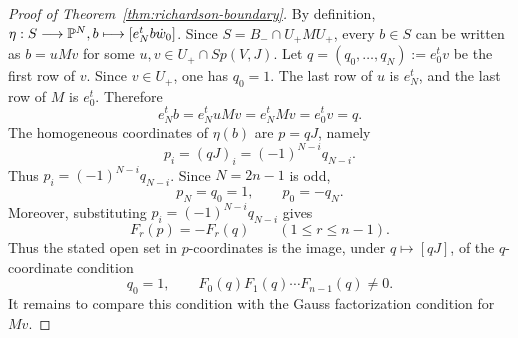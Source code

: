\begin{proof}[Proof of Theorem~\ref{thm:richardson-boundary}]
By definition, \(\eta:S\longrightarrow \mathbb{P}^N,b\longmapsto [e_N^tb\dot w_0]\). Since \(S=B_-\cap U_+MU_+\), every \(b\in S\) can be written as \(b=uMv\) for some \(u,v\in U_+\cap Sp(V,J)\). Let \(q=(q_0,\ldots,q_N):=e_0^tv\) be the first row of \(v\). Since \(v\in U_+\), one has \(q_0=1\). The last row of \(u\) is \(e_N^t\), and the last row of \(M\) is \(e_0^t\). Therefore
\[
e_N^tb=e_N^tuMv=e_N^tMv=e_0^tv=q.
\]
The homogeneous coordinates of \(\eta(b)\) are \(p=qJ\), namely
\[
p_i=(qJ)_i=(-1)^{N-i}q_{N-i}.
\]
Thus \(p_i=(-1)^{N-i}q_{N-i}\). Since \(N=2n-1\) is odd,
\[
p_N=q_0=1,
\qquad
p_0=-q_N.
\]
Moreover, substituting \(p_i=(-1)^{N-i}q_{N-i}\) gives
\[
F_r(p)=-F_r(q)
\qquad
(1\le r\le n-1).
\]
Thus the stated open set in \(p\)-coordinates is the image, under \(q\mapsto [qJ]\), of the \(q\)-coordinate condition
\[
q_0=1,\qquad F_0(q)F_1(q)\cdots F_{n-1}(q)\ne0.
\]
It remains to compare this condition with the Gauss factorization condition for \(Mv\).


\end{proof}
